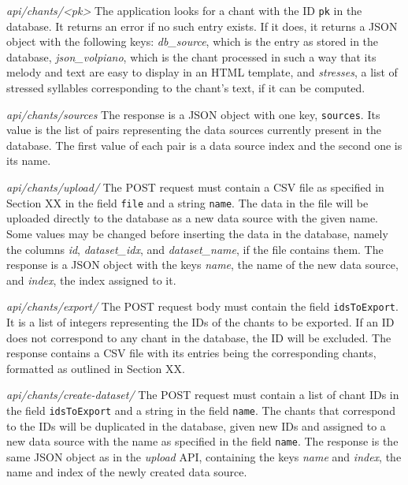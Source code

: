 \emph{api/chants/\textless pk\textgreater} The application looks for a chant with the ID \verb|pk| in the database. It returns an error if no such entry exists. If it does,
it returns a JSON object with the following keys: \emph{db\_source}, which is the entry as stored in the database, \emph{json\_volpiano}, which is the chant processed in
such a way that its melody and text are easy to display in an HTML template, and \emph{stresses}, a list of stressed syllables corresponding to the chant's text, if it
can be computed.

\emph{api/chants/sources} The response is a JSON object with one key, \verb|sources|. Its value is the list of pairs representing the data sources currently present in
the database. The first value of each pair is a data source index and the second one is its name.

\emph{api/chants/upload/} The POST request must contain a CSV file as specified in Section XX in the field \verb|file| and a string \verb|name|. The data in the file
will be uploaded directly to the database as a new data source with the given name. Some values may be changed before inserting the data in the database, namely the columns
\emph{id}, \emph{dataset\_idx}, and \emph{dataset\_name}, if the file contains them. The response is a JSON object with the keys \emph{name}, the name of the new data
source, and \emph{index}, the index assigned to it.

\emph{api/chants/export/} The POST request body must contain the field \verb|idsToExport|. It is a list of integers representing the IDs of the chants to be exported. If
an ID does not correspond to any chant in the database, the ID will be excluded. The response contains a CSV file with its entries being the corresponding chants, formatted
as outlined in Section XX.

\emph{api/chants/create-dataset/} The POST request must contain a list of chant IDs in the field \verb|idsToExport| and a string in the field \verb|name|. The chants
that correspond to the IDs will be duplicated in the database, given new IDs and assigned to a new data source with the name as specified in the field \verb|name|.
The response is the same JSON object as in the \emph{upload} API, containing the keys \emph{name} and \emph{index}, the name and index of the newly created data source.


